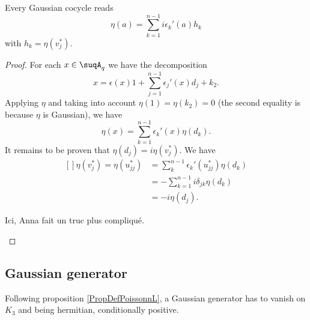 \begin{proposition}     \label{PropGaussCocycle}
    Every Gaussian cocycle reads
    \begin{equation}
        \eta(a)=\sum_{k=1}^{n-1}i\epsilon_k'(a)h_k
    \end{equation}
    with $h_k=\eta(v_j^*)$.
\end{proposition}

\begin{proof}
    For each $x\in\suqA_q$ we have the decomposition
    \begin{equation}
        x=\epsilon(x)1+\sum_{j=1}^{n-1}\epsilon_j'(x)d_j+k_2.
    \end{equation}
    Applying $\eta$ and taking into account $\eta(1)=\eta(k_2)=0$ (the second equality is because $\eta$ is Gaussian), we have
    \begin{equation}
        \eta(x)=\sum_{k=1}^{n-1}\epsilon_k'(x)\eta(d_k).
    \end{equation}
    It remains to be proven that $\eta(d_j)=i\eta(v_j^*)$. We have
    \begin{equation}
        \begin{aligned}[]
            \eta(v_j^*)=\eta(u_{jj}^*)&=\sum_k^{n-1}\epsilon_k'(u_{jj}^*)\eta(d_k)\\
            &=-\sum_{k=1}^{n-1}i\delta_{jk}\eta(d_k)\\
            &=-i\eta(d_j).
        \end{aligned}
    \end{equation}
    \begin{probleme}
        Ici, Anna fait un truc plus compliqué.
    \end{probleme}
    
\end{proof}

\subsection{Gaussian generator}

Following proposition \ref{PropDefPoissonnL}, a Gaussian generator has to vanish on $K_3$ and being hermitian, conditionally positive.


